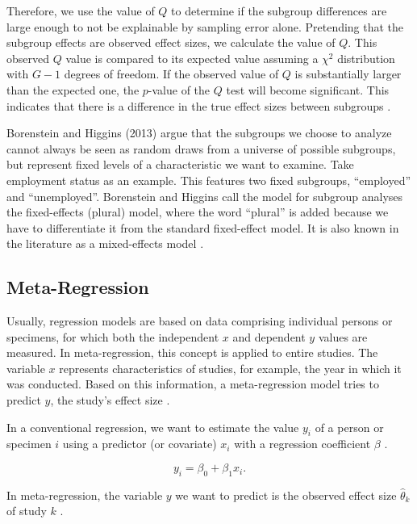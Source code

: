 \documentclass[../../../main.tex]{subfiles}
\begin{document}
Therefore, we use the value of $Q$ to determine if the subgroup differences are large enough to not be explainable by sampling error alone. Pretending that the subgroup effects are observed effect sizes, we calculate the value of $Q$. This observed $Q$ value is compared to its expected value assuming a $\chi^2$ distribution with $G-1$ degrees of freedom. If the observed value of $Q$ is substantially larger than the expected one, the $p$-value of the $Q$ test will become significant. This indicates that there is a difference in the true effect sizes between subgroups \autocite{Harrer2021}.

Borenstein and Higgins (2013) argue that the subgroups we choose to analyze cannot always be seen as random draws from a universe of possible subgroups, but represent fixed levels of a characteristic we want to examine. Take employment status as an example. This features two fixed subgroups, ``employed'' and ``unemployed''. Borenstein and Higgins call the model for subgroup analyses the fixed-effects (plural) model, where the word ``plural'' is added because we have to differentiate it from the standard fixed-effect model. It is also known in the literature as a mixed-effects model \autocite{Harrer2021}.

\subsection{Meta-Regression}

Usually, regression models are based on data comprising individual persons or specimens, for which both the independent $x$ and dependent $y$ values are measured. In meta-regression, this concept is applied to entire studies. The variable $x$ represents characteristics of studies, for example, the year in which it was conducted. Based on this information, a meta-regression model tries to predict $y$, the study's effect size \autocite{Harrer2021}.

In a conventional regression, we want to estimate the value $y_i$ of a person or specimen $i$ using a predictor (or covariate) $x_i$ with a regression coefficient $\beta$ \autocite{Harrer2021}.

\begin{equation}
y_i = \beta_0 + \beta_1 x_i.
\end{equation}

In meta-regression, the variable $y$ we want to predict is the observed effect size $\hat{\theta}_k$ of study $k$ \autocite{Harrer2021}.
\end{document}
